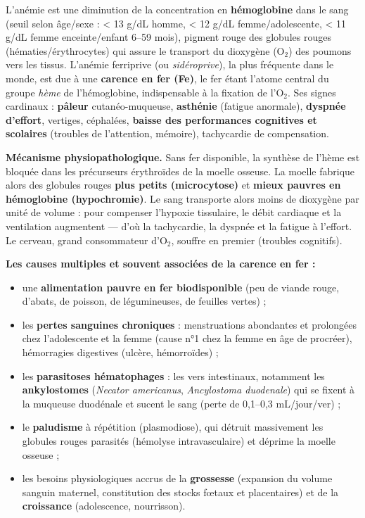 \documentclass[11pt]{article}
\newcommand{\cle}[1]{{\popxbold\color{popdark}#1}}
\begin{document}
\begin{definition}
L'\cle{anémie} est une diminution de la concentration en \textbf{hémoglobine} dans le sang (seuil selon âge/sexe : < 13 g/dL homme, < 12 g/dL femme/adolescente, < 11 g/dL femme enceinte/enfant 6--59 mois), pigment rouge des globules rouges (hématies/érythrocytes) qui assure le transport du dioxygène (O$_2$) des poumons vers les tissus. L'\cle{anémie ferriprive} (ou \emph{sidéroprive}), la plus fréquente dans le monde, est due à une \textbf{carence en fer (Fe)}, le fer étant l'atome central du groupe \emph{hème} de l'hémoglobine, indispensable à la fixation de l'O$_2$. Ses signes cardinaux : \textbf{pâleur} cutanéo-muqueuse, \textbf{asthénie} (fatigue anormale), \textbf{dyspnée d'effort}, vertiges, céphalées, \textbf{baisse des performances cognitives et scolaires} (troubles de l'attention, mémoire), tachycardie de compensation.
\end{definition}

\textbf{Mécanisme physiopathologique.} Sans fer disponible, la synthèse de l'hème est bloquée dans les précurseurs érythroïdes de la moelle osseuse. La moelle fabrique alors des globules rouges \textbf{plus petits (microcytose)} et \textbf{mieux pauvres en hémoglobine (hypochromie)}. Le sang transporte alors moins de dioxygène par unité de volume : pour compenser l'hypoxie tissulaire, le débit cardiaque et la ventilation augmentent — d'où la tachycardie, la dyspnée et la fatigue à l'effort. Le cerveau, grand consommateur d'O$_2$, souffre en premier (troubles cognitifs).

\textbf{Les causes multiples et souvent associées de la carence en fer :}
\begin{itemize}
\item une \textbf{alimentation pauvre en fer biodisponible} (peu de viande rouge, d'abats, de poisson, de légumineuses, de feuilles vertes) ;
\item les \textbf{pertes sanguines chroniques} : menstruations abondantes et prolongées chez l'adolescente et la femme (cause n°1 chez la femme en âge de procréer), hémorragies digestives (ulcère, hémorroïdes) ;
\item les \textbf{parasitoses hématophages} : les vers intestinaux, notamment les \textbf{ankylostomes} (\emph{Necator americanus}, \emph{Ancylostoma duodenale}) qui se fixent à la muqueuse duodénale et sucent le sang (perte de 0,1--0,3 mL/jour/ver) ;
\item le \textbf{paludisme} à répétition (plasmodiose), qui détruit massivement les globules rouges parasités (hémolyse intravasculaire) et déprime la moelle osseuse ;
\item les besoins physiologiques accrus de la \textbf{grossesse} (expansion du volume sanguin maternel, constitution des stocks fœtaux et placentaires) et de la \textbf{croissance} (adolescence, nourrisson).
\end{itemize}
\end{document}
